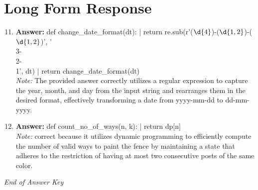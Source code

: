 \documentclass[12pt]{article}
\begin{document}
\section*{Long Form Response}
\begin{enumerate}[label=\arabic*.]
\setcounter{enumi}{10}
\item \textbf{Answer:} def change\_date\_format(dt): | return re.sub(r'(\ensuremath{\d{4}})-(\ensuremath{\d{1,2}})-(\ensuremath{\d{1,2}})', '\\3-\\2-\\1', dt) | return change\_date\_format(dt)
\\ \textit{Note:} The provided answer correctly utilizes a regular expression to capture the year, month, and day from the input string and rearranges them in the desired format, effectively transforming a date from yyyy-mm-dd to dd-mm-yyyy.
\item \textbf{Answer:} def count\_no\_of\_ways(n, k): | return dp[n]
\\ \textit{Note:} correct because it utilizes dynamic programming to efficiently compute the number of valid ways to paint the fence by maintaining a state that adheres to the restriction of having at most two consecutive posts of the same color.
\end{enumerate}

\vfill
\noindent\textit{End of Answer Key}
\end{document}
